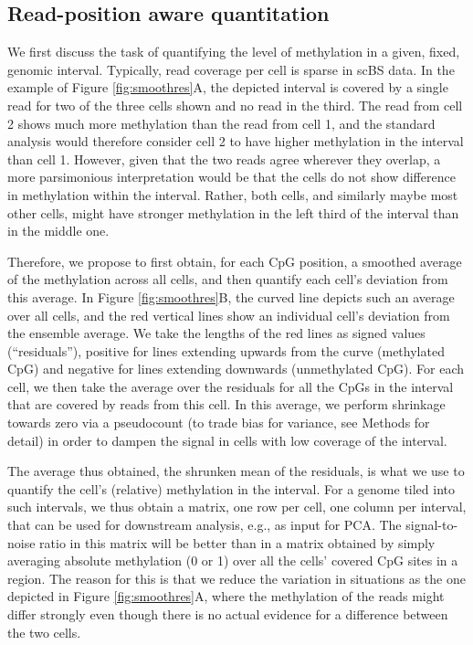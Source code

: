 \documentclass[10pt]{article}
\begin{document}
\subsection*{Read-position aware quantitation} \label{residuals}

We first discuss the task of quantifying the level of methylation in a given, fixed, genomic interval.
Typically, read coverage per cell is sparse in scBS data.
In the example of Figure \ref{fig:smoothres}A, the depicted interval is covered by a single read for two of the three cells shown and no read in the third.
The read from cell 2 shows much more methylation than the read from cell 1, and the standard analysis would therefore consider cell 2 to have higher methylation in the interval than cell 1.
However, given that the two reads agree wherever they overlap, a more parsimonious interpretation would be that the cells do not show difference in methylation within the interval.
Rather, both cells, and similarly maybe most other cells, might have stronger methylation in the left third of the interval than in the middle one.

Therefore, we propose to first obtain, for each CpG position, a smoothed average of the methylation across all cells, and then quantify each cell's deviation from this average.
In Figure \ref{fig:smoothres}B, the curved line depicts such an average over all cells, and the red vertical lines show an individual cell's deviation from the ensemble average.
We take the lengths of the red lines as signed values (``residuals''), positive for lines extending upwards from the curve (methylated CpG) and negative for lines extending downwards (unmethylated CpG).
For each cell, we then take the average over the residuals for all the CpGs in the interval that are covered by reads from this cell.
In this average, we perform shrinkage towards zero via a pseudocount (to trade bias for variance, see Methods for detail) in order to dampen the signal in cells with low coverage of the interval.

The average thus obtained, the shrunken mean of the residuals, is what we use to quantify the cell's (relative) methylation in the interval.
For a genome tiled into such intervals, we thus obtain a matrix, one row per cell, one column per interval, that can be used for downstream analysis, e.g., as input for PCA.
The signal-to-noise ratio in this matrix will be better than in a matrix obtained by simply averaging absolute methylation (0 or 1) over all the cells' covered CpG sites in a region.
The reason for this is that we reduce the variation in situations as the one depicted in Figure \ref{fig:smoothres}A, where the methylation of the reads might differ strongly even though there is no actual evidence for a difference between the two cells.
\end{document}
